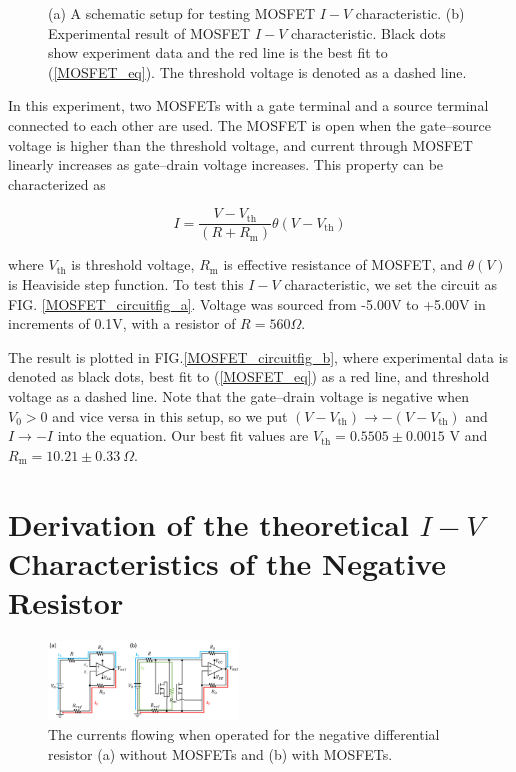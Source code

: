 \documentclass[%
 aip,
amsmath,amssymb,
reprint,
]{revtex4-1}
\begin{document}
\begin{figure}[!htbp]
\caption{(a) A schematic setup for testing MOSFET $I-V$ characteristic. (b) Experimental result of MOSFET $I-V$ characteristic. Black dots show experiment data and the red line is the best fit to (\ref{MOSFET_eq}). The threshold voltage is denoted as a dashed line.} \label{MOSFET_circuitfig}
\end{figure}

In this experiment, two MOSFETs with a gate terminal and a source terminal connected to each other are used.
The MOSFET is open when the gate--source voltage is higher than the threshold voltage, and current through MOSFET linearly increases as gate--drain voltage increases.
This property can be characterized as 

\begin{equation}
I=\frac{V-V_{\textrm{th}}}{(R+R_{\textrm{m}})}\theta(V-V_{\textrm{th}})
\label{MOSFET_eq}
\end{equation}

\noindent where $V_{\textrm{th}}$ is threshold voltage, $R_{\textrm{m}}$ is effective resistance of MOSFET, and $\theta(V)$ is Heaviside step function.
To test this $I-V$ characteristic, we set the circuit as FIG. \ref{MOSFET_circuitfig_a}.
Voltage was sourced from -5.00V to +5.00V in increments of 0.1V, with a resistor of $R=560\Omega$.

The result is plotted in FIG.\ref{MOSFET_circuitfig_b}, where experimental data is denoted as black dots, best fit to (\ref{MOSFET_eq}) as a red line, and threshold voltage as a dashed line.
Note that the gate--drain voltage is negative when $V_{0}>0$ and vice versa in this setup, so we put $(V-V_{\textrm{th}})\rightarrow-(V-V_{\textrm{th}})$ and $I\rightarrow -I$ into the equation.
Our best fit values are $V_{\textrm{th}}=0.5505\pm0.0015$ V and $R_{\textrm{m}}=10.21\pm0.33\>\Omega$.


\section{Derivation of the theoretical $I-V$ Characteristics of the Negative Resistor}

\begin{figure}[!h]
  \centering
  \includegraphics[width=0.45\textwidth]{figures/Appendix2.png}
  \caption{The currents flowing when operated for the negative differential resistor (a) without MOSFETs and (b) with MOSFETs.}
  \label{fig:OpAmpTheory}
\end{figure}
\end{document}
